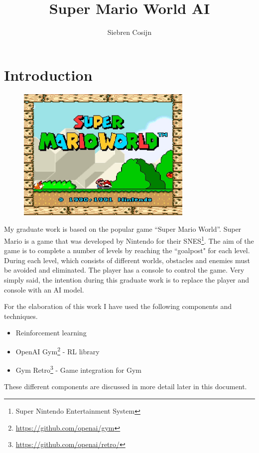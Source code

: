 \documentclass{article}
\title{Super Mario World AI}
\author{Siebren Cosijn}
\date{\displaydate{date}}
\begin{document}
    \maketitle

    \section{Introduction}
    \begin{figure}[H]
        \centering
        \includegraphics[width=0.75\textwidth]{start-screen}
    \end{figure}
    My graduate work is based on the popular game ``Super Mario World''.
    Super Mario is a game that was developed by Nintendo for their SNES\footnote{Super Nintendo Entertainment System}.
    The aim of the game is to complete a number of levels by reaching the “goalpost" for each level.
    During each level, which consists of different worlds, obstacles and enemies must be avoided and eliminated.
    The player has a console to control the game.
    Very simply said, the intention during this graduate work is to replace the player and console with an AI model.

    For the elaboration of this work I have used the following components and techniques.
    \begin{itemize}
        \item Reinforcement learning
        \item OpenAI Gym\footnote{\url{https://github.com/openai/gym}} \cite{brockman2016openai} - RL library
        \item Gym Retro\footnote{\url{https://github.com/openai/retro/}} - Game integration for Gym
    \end{itemize}
    These different components are discussed in more detail later in this document.
\end{document}
